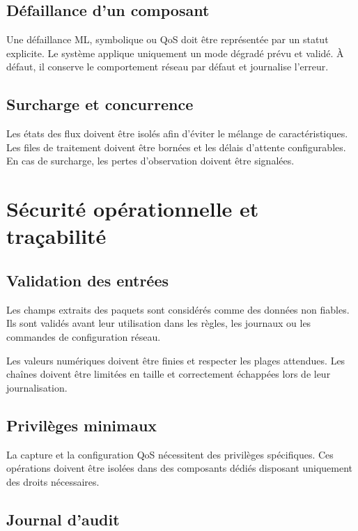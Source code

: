 \subsection{Défaillance d'un composant}

Une défaillance ML, symbolique ou QoS doit être représentée
par un statut explicite. Le système applique uniquement
un mode dégradé prévu et validé. À défaut, il conserve
le comportement réseau par défaut et journalise l'erreur.

\subsection{Surcharge et concurrence}

Les états des flux doivent être isolés afin d'éviter
le mélange de caractéristiques. Les files de traitement
doivent être bornées et les délais d'attente configurables.
En cas de surcharge, les pertes d'observation doivent
être signalées.

\section{Sécurité opérationnelle et traçabilité}

\subsection{Validation des entrées}

Les champs extraits des paquets sont considérés comme
des données non fiables. Ils sont validés avant leur
utilisation dans les règles, les journaux ou les commandes
de configuration réseau.

Les valeurs numériques doivent être finies et respecter
les plages attendues. Les chaînes doivent être limitées
en taille et correctement échappées lors de leur journalisation.

\subsection{Privilèges minimaux}

La capture et la configuration QoS nécessitent des privilèges
spécifiques. Ces opérations doivent être isolées dans des
composants dédiés disposant uniquement des droits nécessaires.

\subsection{Journal d'audit}


